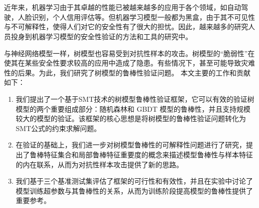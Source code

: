 \vspace{-2.5cm}
\chapter*{}

近年来，机器学习由于其卓越的性能已被越来越多的应用于各个领域，如自动驾驶，人脸识别，个人信用评估等。但机器学习模型一般都为黑盒，由于其不可见性与不可解释性，使得人们对它的安全性有了很大的担忧。因此，越来越多的研究人员投身到机器学习模型的安全性验证的方法和工具的研究中。

与神经网络模型一样，树模型也容易受到对抗性样本的攻击。树模型的“脆弱性”在使其在某些安全性要求较高的应用中造成了隐患。有些情况下，甚至可能导致灾难性的后果。为此，我们研究了树模型的鲁棒性验证问题。
本文主要的工作和贡献如下：
\begin{enumerate}
	\item 我们提出了一个基于SMT技术的树模型鲁棒性验证框架，它可以有效的验证树模型的两个重要组成部分：随机森林和 GBDT 模型的鲁棒性，并且支持规模较大的模型的验证。该框架的核心思想是将树模型的鲁棒性验证问题转化为SMT公式的约束求解问题。
	\item 在验证的基础上，我们进一步对树模型鲁棒性的可解释性问题进行了研究，提出了鲁棒特征集合和局部鲁棒特征重要度的概念来描述模型鲁棒性与样本特征的内在联系，从而为对抗性样本攻击提供了新的思路。
	\item 我们基于三个基准测试集评估了框架的可行性和有效性，并且在实验中讨论了模型训练超参数与其鲁棒性的关系，从而为训练阶段提高模型的鲁棒性提供了重要参考。
\end{enumerate}
\hspace{-0.5cm}
 
